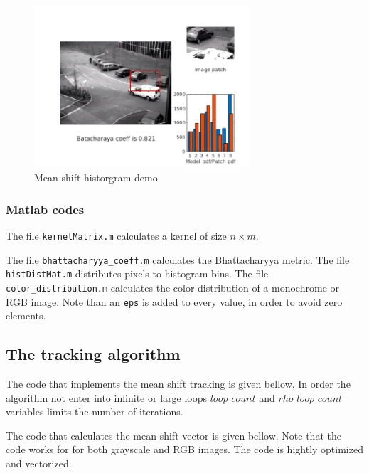 \documentclass[a4paper,12pt]{article}
\begin{document}
\begin{figure}[h]
        \centering
        \includegraphics[width=8cm]{../Videos/demo_algo_meanshift_car.png}
        \caption{Mean shift historgram demo}
		\label{fig:demo1}
\end{figure}

\subsubsection{Matlab codes}

The file \texttt{kernelMatrix.m} calculates a kernel of size $n\times{}m$.



The file \texttt{bhattacharyya\_coeff.m} calculates the Bhattacharyya metric. The file \texttt{histDistMat.m} distributes pixels to histogram bins. The file \texttt{color\_distribution.m} calculates the color distribution of a monochrome or RGB image. Note than an \texttt{eps} is added to every value, in order  to avoid zero elements.



\subsection{The tracking algorithm}
The code that implements the mean shift tracking is given bellow. In order the algorithm not enter into infinite or large loops $loop\_count$ and $rho\_loop\_count$ variables limits the number of iterations.



\noindent The code that calculates the mean shift vector is given bellow. Note that the code works for for both grayscale and RGB images. The code is hightly optimized and vectorized.

\end{document}
